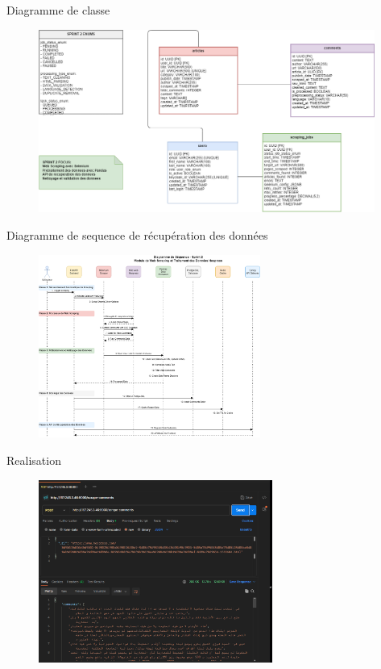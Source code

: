 \begin{frame}{Diagramme de classe}

    \begin{figure}[H]
        \centering
        \includegraphics[height=6cm]{assets/images/sprint2-class.png}
    \end{figure}
\end{frame}

\begin{frame}{Diagramme de sequence de récupération des données}
    \begin{figure}[H]
        \centering
        \includegraphics[height=6cm]{assets/images/sprint2-sequence.png}
    \end{figure}
\end{frame}

\begin{frame}{Realisation}
    \begin{figure}[H]
        \centering
        \includegraphics[height=6cm]{assets/images/scrape-ui.png}
    \end{figure}
\end{frame}



